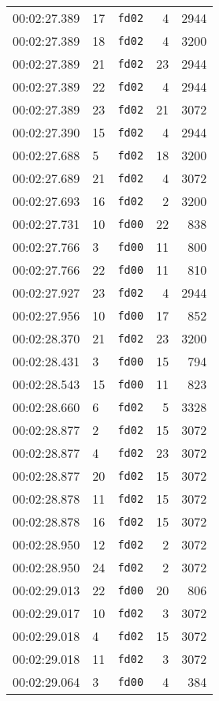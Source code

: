 \documentclass{article}
\begin{document}
\begin{longtable}{lllrr}
00:02:27.389 & 17 & \texttt{fd02} & 4 & 2944 \\
00:02:27.389 & 18 & \texttt{fd02} & 4 & 3200 \\
00:02:27.389 & 21 & \texttt{fd02} & 23 & 2944 \\
00:02:27.389 & 22 & \texttt{fd02} & 4 & 2944 \\
00:02:27.389 & 23 & \texttt{fd02} & 21 & 3072 \\
00:02:27.390 & 15 & \texttt{fd02} & 4 & 2944 \\
00:02:27.688 & 5 & \texttt{fd02} & 18 & 3200 \\
00:02:27.689 & 21 & \texttt{fd02} & 4 & 3072 \\
00:02:27.693 & 16 & \texttt{fd02} & 2 & 3200 \\
00:02:27.731 & 10 & \texttt{fd00} & 22 & 838 \\
00:02:27.766 & 3 & \texttt{fd00} & 11 & 800 \\
00:02:27.766 & 22 & \texttt{fd00} & 11 & 810 \\
00:02:27.927 & 23 & \texttt{fd02} & 4 & 2944 \\
00:02:27.956 & 10 & \texttt{fd00} & 17 & 852 \\
00:02:28.370 & 21 & \texttt{fd02} & 23 & 3200 \\
00:02:28.431 & 3 & \texttt{fd00} & 15 & 794 \\
00:02:28.543 & 15 & \texttt{fd00} & 11 & 823 \\
00:02:28.660 & 6 & \texttt{fd02} & 5 & 3328 \\
00:02:28.877 & 2 & \texttt{fd02} & 15 & 3072 \\
00:02:28.877 & 4 & \texttt{fd02} & 23 & 3072 \\
00:02:28.877 & 20 & \texttt{fd02} & 15 & 3072 \\
00:02:28.878 & 11 & \texttt{fd02} & 15 & 3072 \\
00:02:28.878 & 16 & \texttt{fd02} & 15 & 3072 \\
00:02:28.950 & 12 & \texttt{fd02} & 2 & 3072 \\
00:02:28.950 & 24 & \texttt{fd02} & 2 & 3072 \\
00:02:29.013 & 22 & \texttt{fd00} & 20 & 806 \\
00:02:29.017 & 10 & \texttt{fd02} & 3 & 3072 \\
00:02:29.018 & 4 & \texttt{fd02} & 15 & 3072 \\
00:02:29.018 & 11 & \texttt{fd02} & 3 & 3072 \\
00:02:29.064 & 3 & \texttt{fd00} & 4 & 384 \\

\end{longtable}
\end{document}
